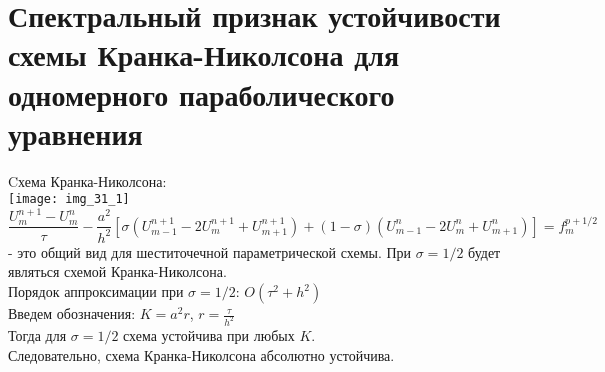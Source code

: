 \documentclass[__main__.tex]{subfiles}
\begin{document}
\section{Спектральный признак устойчивости схемы Кранка-Николсона для одномерного параболического уравнения}
Cхема Кранка-Николсона: \\
\texttt{[image: img\_31\_1]}
$$\frac{U_m^{n+1}-U_{m}^{n}}{\tau} - \frac{a^2}{h^2}[\sigma(U_{m-1}^{n+1}-2U_{m}^{n+1}+U_{m+1}^{n+1}) + (1-\sigma)(U_{m-1}^{n}-2U_m^n+U_{m+1}^{n})] = f_m^{p+1/2}$$
- это общий вид для шеститочечной параметрической схемы. При $\sigma = 1/2$ будет являться схемой Кранка-Николсона. \\
Порядок аппроксимации при $\sigma = 1/2$: $O(\tau^2+h^2)$ \\
Введем обозначения:
$ K = a^2r$,  $r =\frac{\tau}{h^2}$ \\
Тогда для $\sigma = 1/2$ схема устойчива при любых $K$. \\
Следовательно, схема Кранка-Николсона абсолютно устойчива.
\end{document}

